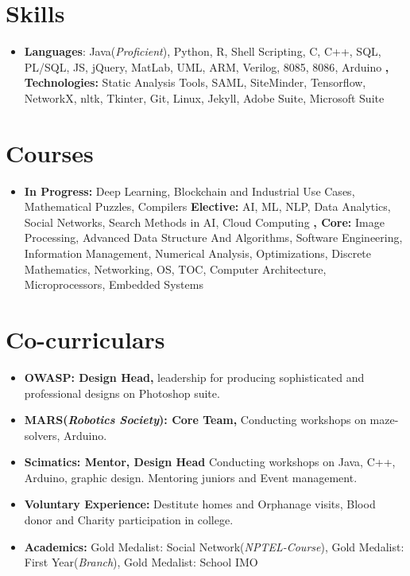 \documentclass[letterpaper,10pt]{article}
\newcommand{\resumeSubHeadingListStart}{\begin{itemize}[leftmargin=*]}
\newcommand{\resumeSubHeadingListEnd}{\end{itemize}}
\begin{document}
\section{Skills}
  \resumeSubHeadingListStart
    \item{
      \textbf{Languages}{: Java}{(\textit{Proficient})}{,}{ Python}{,}{ R}{,}{ Shell}{ Scripting}{,}{ C}{,}{ C++}{,}{ SQL}{,}{ PL/SQL}{,}{ JS}{,}{ jQuery}{,}{ MatLab}{,}{ UML}{,}{ ARM}{,}{ Verilog}{,}{ 8085}{,}{ 8086}{,}{ Arduino}
      \textbf{, Technologies: }{ Static Analysis Tools}{,}{ SAML}{,}{ SiteMinder}{,}{ Tensorflow}{,}{ NetworkX}{,}{ nltk}{,}{ Tkinter}{,}{ Git}{,}{ Linux}{,}{ Jekyll}{,}{ Adobe Suite}{,}{ Microsoft Suite}
    }
  \resumeSubHeadingListEnd

\section{Courses}
  \resumeSubHeadingListStart
    \item{
      \textbf{In Progress:}{ Deep Learning}{,}{ Blockchain and Industrial Use Cases}{,}{ Mathematical Puzzles}{,}{ Compilers}
      \textbf{Elective:}{ AI}{,}{ ML}{,}{ NLP}{,}{ Data Analytics}{,}{ Social Networks}{,}{ Search Methods in AI}{,}{ Cloud Computing}
      \textbf{, Core:}{ Image Processing}{,}{ Advanced Data Structure And Algorithms}{,}{ Software Engineering}{,}{ Information Management}{,}{ Numerical Analysis}{,}{ Optimizations}{,}{ Discrete Mathematics}{,}{ Networking}{,}{ OS}{,}{ TOC}{,}{ Computer Architecture}{,}{ Microprocessors}{,}{ Embedded Systems}   
         }
  \resumeSubHeadingListEnd

\section{Co-curriculars}
  \resumeSubHeadingListStart
    \item{
      \textbf{OWASP: Design Head, }{leadership for producing sophisticated and professional designs on Photoshop suite.}
         }
    \item{
      \textbf{MARS(\textit{Robotics Society}): Core Team, }{Conducting workshops on maze-solvers, Arduino.}
         }
    \item{
      \textbf{Scimatics: Mentor, Design Head }{Conducting workshops on Java, C++, Arduino, graphic design. Mentoring juniors and Event management.}
         }
    \item{
      \textbf{Voluntary Experience: }{Destitute homes and Orphanage visits, Blood donor and Charity participation in college.}
         }         
\item{
      \textbf{Academics: }{Gold Medalist: Social Network(\textit{NPTEL-Course}), Gold Medalist: First Year(\textit{Branch}), Gold Medalist: School IMO}
         }         

  \resumeSubHeadingListEnd

\end{document}
